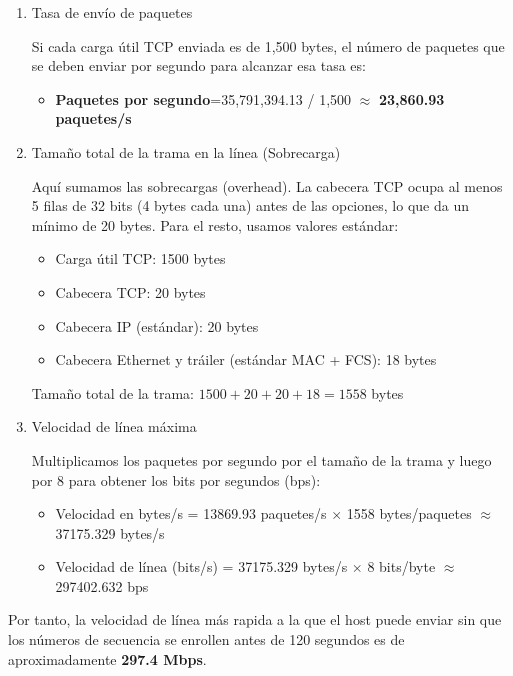 \begin{enumerate}[label=\color{red}\textbf{\arabic*)}]
\begin{enumerate}[label=\arabic*)]
		            Para asegurar que ningún número de secuencia se enrolle (se repita) mientras un paquete antiguo sigue vivo en la red (120 segundos de duración máxima), el host not puede agotar los $2^{32}$ bytes en menos de ese tiempo.
		            \begin{itemize}[label=\textbullet]
			            \item \textbf{Tasa de datos últil}=$2^{32}$ bytes / 120 segundos = \textbf{35,791,394.13 bytes/s}
		            \end{itemize}
		      \item Tasa de envío de paquetes

		            Si cada carga útil TCP enviada es de 1,500 bytes, el número de paquetes que se deben enviar por segundo para alcanzar esa tasa es:
		            \begin{itemize}[label=\textbullet]
			            \item \textbf{Paquetes por segundo}=35,791,394.13 / 1,500 $\approx$ \textbf{23,860.93 paquetes/s}
		            \end{itemize}
		      \item Tamaño total de la trama en la línea (Sobrecarga)

		            Aquí sumamos las sobrecargas (overhead). La cabecera TCP ocupa al menos 5 filas de 32 bits (4 bytes cada una) antes de las opciones, lo que da un mínimo de 20 bytes. Para el resto, usamos valores estándar:
		            \begin{itemize}[label=\textbullet]
			            \item Carga útil TCP: 1500 bytes
			            \item Cabecera TCP: 20 bytes
			            \item Cabecera IP (estándar): 20 bytes
			            \item Cabecera Ethernet y tráiler (estándar MAC + FCS): 18 bytes
		            \end{itemize}
		            \begin{center}
			            Tamaño total de la trama: $1500+20+20+18=1558$ bytes
		            \end{center}
		      \item Velocidad de línea máxima

		            Multiplicamos los paquetes por segundo por el tamaño de la trama y luego por 8 para obtener los bits por segundos (bps):
		            \begin{itemize}[label=\textbullet]
			            \item Velocidad en bytes/s = 13869.93 paquetes/s $\times$ 1558 bytes/paquetes $\approx$ 37175.329 bytes/s
			            \item Velocidad de línea (bits/s) = 37175.329 bytes/s $\times $ 8 bits/byte $\approx$ 297402.632 bps
		            \end{itemize}
	      \end{enumerate}
	      Por tanto, la velocidad de línea más rapida a la que el host puede enviar sin que los números de secuencia se enrollen antes de 120 segundos es de aproximadamente \textbf{297.4 Mbps}.


\end{enumerate}
